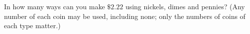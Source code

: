 In how many ways can you make $\$2.22$ using nickels, dimes and pennies? (Any number of each coin may be used, including none; only the numbers of coins of each type matter.)
